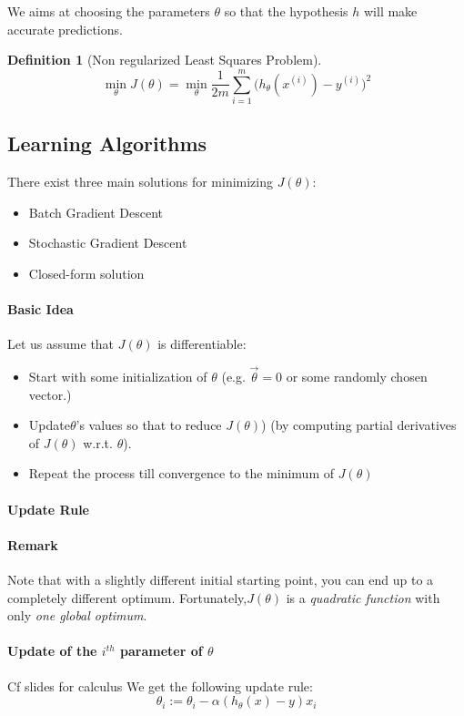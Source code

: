 \documentclass{article}
\newtheorem{defi}{Definition}
\begin{document}
We aims at choosing the parameters $\theta$ so that the hypothesis $h$ will make accurate predictions.

\begin{defi}[Non regularized Least Squares Problem]
\[\min_{\theta} J(\theta) = \min_{\theta} \frac{1}{2m}\sum_{i=1}^m \Big( h_\theta(x^{(i)}) - y^{(i)}\Big)^2\]
\end{defi}

\subsection{Learning Algorithms}
There exist three main solutions for minimizing $J(\theta)$:
\begin{itemize}
\item Batch Gradient Descent
\item Stochastic Gradient Descent
\item Closed-form solution
\end{itemize}

\paragraph{Basic Idea}
Let us assume that $J(\theta)$ is differentiable:
\begin{itemize}
\item Start with some initialization of $\theta$ (e.g. $\vec{\theta} =0$ or some randomly
chosen vector.)
\item Update$\theta$'s values so that to reduce $J(\theta)$) (by computing partial
derivatives of $J(\theta)$ w.r.t. $\theta$).
\item Repeat the process till convergence to the minimum of $J(\theta)$
\end{itemize}

\paragraph{Update Rule}


\paragraph{Remark}
Note that with a slightly different initial starting point, you can end up to a completely different optimum. Fortunately,$J(\theta)$ is a \emph{quadratic function} with only \emph{one global optimum}.

\paragraph{Update of the $i^{th}$ parameter of $\theta$}
Cf slides for calculus
We get the following update rule:
\[ \theta_i := \theta_i - \alpha(h_\theta(x)-y)x_i\]
\end{document}
